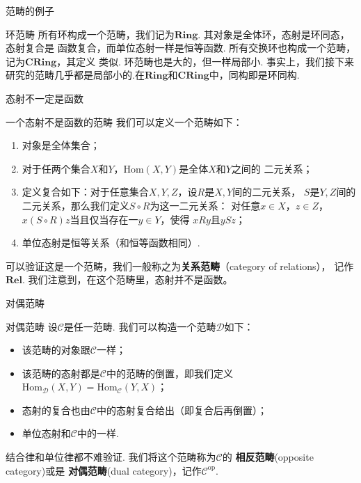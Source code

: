 \documentclass{beamer}
\newcommand\cat{\mathcal{C}}
\newcommand\Hom[2]{\mathrm{Hom}(#1, #2)}
\newcommand\Homc[3]{\mathrm{Hom}_{#1}(#2, #3)}
\newcommand\Ring{\mathbf{Ring}}
\newcommand\CRing{\mathbf{CRing}}
\newcommand\opp[1]{{#1}^{\mathrm{op}}}
\begin{document}
	\begin{frame}{范畴的例子}
		\begin{exampleblock}{环范畴}
			所有环构成一个范畴，我们记为$\Ring$. 其对象是全体环，态射是环同态，态射复合是
			函数复合，而单位态射一样是恒等函数. 所有交换环也构成一个范畴，记为$\CRing$，其定义
			类似. 环范畴也是大的，但一样局部小. 事实上，我们接下来研究的范畴几乎都是局部小的.在$\Ring$和$\CRing$中，同构即是环同构.
		\end{exampleblock}
	\end{frame}
	
	\begin{frame}{态射不一定是函数}
		\begin{exampleblock}{一个态射不是函数的范畴}
			我们可以定义一个范畴如下：
			\begin{enumerate}
				\item 对象是全体集合；
				\item 对于任两个集合$X$和$Y$，$\Hom{X}{Y}$是全体$X$和$Y$之间的
				二元关系；
				\item 定义复合如下：对于任意集合$X, Y, Z$，设$R$是$X, Y$间的二元关系，
				$S$是$Y, Z$间的二元关系，那么我们定义$S \circ R$为这一二元关系：
				对任意$x \in X$，$z \in Z$，$x (S \circ R) z$当且仅当存在一$y \in Y$，使得
				$x R y$且$y S z$；
				\item 单位态射是恒等关系（和恒等函数相同）.
			\end{enumerate}
			
			可以验证这是一个范畴，我们一般称之为\textbf{关系范畴}（category of relations），
			记作$\mathbf{Rel}$. 我们注意到，在这个范畴里，态射并不是函数。
		\end{exampleblock}
		
	\end{frame}
	
	\begin{frame}{对偶范畴}
		\begin{exampleblock}{对偶范畴}
			设$\cat$是任一范畴. 我们可以构造一个范畴$\mathcal{D}$如下：
			\begin{itemize}
				\item 该范畴的对象跟$\cat$一样；
				\item 该范畴的态射都是$\cat$中的范畴的倒置，即我们定义
				$\Homc{\mathcal{D}}{X}{Y} = \Homc{\cat}{Y}{X}$；
				\item 态射的复合也由$\cat$中的态射复合给出（即复合后再倒置）；
				\item 单位态射和$\cat$中的一样.
			\end{itemize}
			
			结合律和单位律都不难验证. 我们将这个范畴称为$\mathcal{C}$的
			\textbf{相反范畴}(opposite category)或是
			\textbf{对偶范畴}(dual category)，记作$\opp{\cat}$.
		\end{exampleblock}
	\end{frame}
\end{document}
